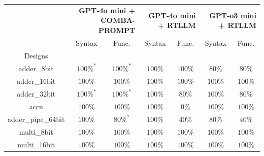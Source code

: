 \begin{tabular}{c|cc|cc|cc}
\toprule
 & \multicolumn{2}{r}{\bfseries GPT‑4o mini + COMBA-PROMPT} & \multicolumn{2}{r}{\bfseries GPT‑4o mini + RTLLM } & \multicolumn{2}{r}{\bfseries GPT‑o3 mini + RTLLM } \\
 & Syntax & Func. & Syntax & Func. & Syntax & Func. \\
Designs &  &  &  &  &  &  \\
\midrule
adder\_8bit & \color{black} {\cellcolor{lightblue}} $100\%^*$ & \color{black} {\cellcolor{lightgreen}} $100\%^*$ & \color{black} {\cellcolor{lightblue}} $100\%$ & \color{black} {\cellcolor{lightgreen}} $100\%$ & $80\%$ & $80\%$ \\ \midrule
adder\_16bit & \color{black} {\cellcolor{lightblue}} $100\%$ & \color{black} {\cellcolor{lightgreen}} $100\%$ & \color{black} {\cellcolor{lightblue}} $100\%$ & \color{black} {\cellcolor{lightgreen}} $100\%$ & \color{black} {\cellcolor{lightblue}} $100\%$ & \color{black} {\cellcolor{lightgreen}} $100\%$ \\ \midrule
adder\_32bit & \color{black} {\cellcolor{lightblue}} $100\%^*$ & \color{black} {\cellcolor{lightgreen}} $100\%^*$ & \color{black} {\cellcolor{lightblue}} $100\%$ & $80\%$ & \color{black} {\cellcolor{lightblue}} $100\%$ & $80\%$ \\ \midrule
accu & \color{black} {\cellcolor{lightblue}} $100\%$ & \color{black} {\cellcolor{lightgreen}} $100\%$ & \color{black} {\cellcolor{lightblue}} $100\%$ & $0\%$ & \color{black} {\cellcolor{lightblue}} $100\%$ & \color{black} {\cellcolor{lightgreen}} $100\%$ \\ \midrule
adder\_pipe\_64bit & \color{black} {\cellcolor{lightblue}} $100\%$ & \color{black} {\cellcolor{lightgreen}} $80\%^*$ & \color{black} {\cellcolor{lightblue}} $100\%$ & $40\%$ & $80\%$ & $40\%$ \\ \midrule
multi\_8bit & \color{black} {\cellcolor{lightblue}} $100\%$ & \color{black} {\cellcolor{lightgreen}} $100\%$ & \color{black} {\cellcolor{lightblue}} $100\%$ & \color{black} {\cellcolor{lightgreen}} $100\%$ & \color{black} {\cellcolor{lightblue}} $100\%$ & \color{black} {\cellcolor{lightgreen}} $100\%$ \\ \midrule
multi\_16bit & \color{black} {\cellcolor{lightblue}} $100\%$ & \color{black} {\cellcolor{lightgreen}} $100\%$ & \color{black} {\cellcolor{lightblue}} $100\%$ & \color{black} {\cellcolor{lightgreen}} $100\%$ & \color{black} {\cellcolor{lightblue}} $100\%$ & \color{black} {\cellcolor{lightgreen}} $100\%$ \\ \midrule

\end{tabular}
